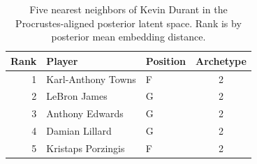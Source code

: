 \begin{table}[htbp]
  \centering\small
  \begin{tabular}{rllc}
    \toprule
    Rank & Player & Position & Archetype \\
    \midrule
    1 & Karl-Anthony Towns & F & 2 \\
    2 & LeBron James & G & 2 \\
    3 & Anthony Edwards & G & 2 \\
    4 & Damian Lillard & G & 2 \\
    5 & Kristaps Porzingis & F & 2 \\
    \bottomrule
  \end{tabular}
  \caption{Five nearest neighbors of Kevin Durant in the Procrustes-aligned posterior latent space. Rank is by posterior mean embedding distance.}
  \label{tab:Kevin_Durant_neighbors}
\end{table}

